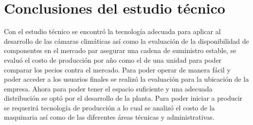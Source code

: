 \newpage



\newpage

\section{Conclusiones del estudio técnico}

Con el estudio técnico se encontró la tecnología adecuada para aplicar al desarrollo de las cámaras climáticas así como la evaluación de la disponibilidad de componentes en el mercado par asegurar una cadena de suministro estable, se evaluó el costo de producción por año como el de una unidad para poder comparar los pecios contra el mercado. Para poder operar de manera fácil y poder acceder a los usuarios finales se realizó la evaluación para la ubicación de la empresa. Ahora para poder tener el espacio suficiente y una adecuada distribución se optó por el desarrollo de la planta. Para poder iniciar a producir se requerirá tecnología de producción a lo cual se analizó el costo de la maquinaria así como de las diferentes áreas técnicas y administrativas.